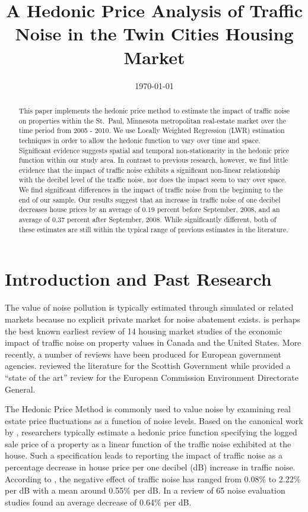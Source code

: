 \documentclass{article}\usepackage{graphicx, color}
\title{A Hedonic Price Analysis of Traffic Noise in the Twin Cities Housing Market}
\date{\today}
\begin{document}
\maketitle

\begin{abstract}
This paper implements the hedonic price method to estimate the impact of traffic noise on properties within the St.\ Paul, Minnesota metropolitan real-estate market over the time period from 2005 - 2010. We use Locally Weighted Regression (LWR) estimation techniques in order to allow the hedonic function to vary over time and space. Significant evidence suggests spatial and temporal non-stationarity in the hedonic price function within our study area. In contrast to previous research, however, we find little evidence that the impact of traffic noise exhibits a significant non-linear relationship with the decibel level of the traffic noise, nor does the impact seem to vary over space. We find significant differences in the impact of traffic noise from the beginning to the end of our sample. Our results suggest that an increase in traffic noise of one decibel decreases house prices by an average of 0.19 percent before September, 2008, and an average of 0.37 percent after September, 2008. While significantly different, both of these estimates are still within the typical range of previous estimates in the literature.
\end{abstract}

\section{Introduction and Past Research}\label{sec:lit}
The value of noise pollution is typically estimated through simulated or related markets because no explicit private market for noise abatement exists. \citet{Nelson1982} is perhaps the best known earliest review of 14 housing market studies of the economic impact of traffic noise on property values in Canada and the United States. More recently, a number of reviews have been produced for European government agencies. \citet{Bateman2001} reviewed the literature for the Scottish Government while \citet{Navrud2002} provided a ``state of the art'' review for the European Commission Environment Directorate General.

The Hedonic Price Method is commonly used to value noise by examining real estate price fluctuations as a function of noise levels. Based on the canonical work by \citet{Rosen1974}, researchers typically estimate a hedonic price function specifying the logged sale price of a property as a linear function of the traffic noise exhibited at the house. Such a specification leads to reporting the impact of traffic noise as a percentage decrease in house price per one decibel (dB) increase in traffic noise. According to \citet{Bateman2001}, the negative effect of traffic noise has ranged from 0.08\% to 2.22\% per dB with a mean around 0.55\% per dB. In a review of 65 noise evaluation studies \citet{Navrud2002} found an average decrease of 0.64\% per dB. 
\end{document}
